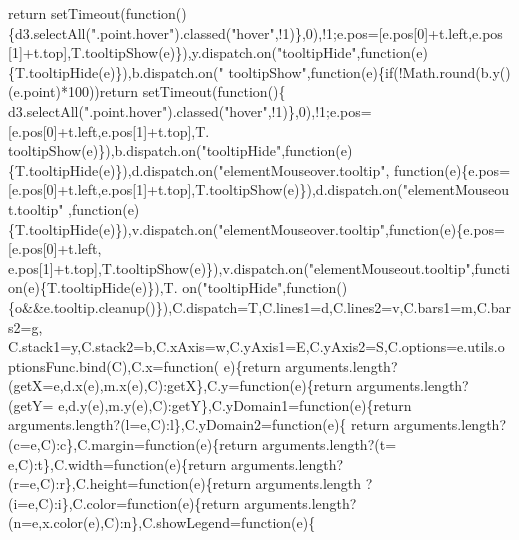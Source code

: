 \begin{DoxyCode}
{      return} setTimeout(\textcolor{keyword}{function}()\{d3.selectAll(\textcolor{stringliteral}{".point.hover"}).classed(\textcolor{stringliteral}{"hover"},!1)\},0),!1;e.pos=[e.pos[0]+t.left,e.pos
      [1]+t.top],T.tooltipShow(e)\}),y.dispatch.on(\textcolor{stringliteral}{"tooltipHide"},\textcolor{keyword}{function}(e)\{T.tooltipHide(e)\}),b.dispatch.on(\textcolor{stringliteral}{"
      tooltipShow"},\textcolor{keyword}{function}(e)\{\textcolor{keywordflow}{if}(!Math.round(b.y()(e.point)*100))\textcolor{keywordflow}{return} setTimeout(\textcolor{keyword}{function}()\{
      d3.selectAll(\textcolor{stringliteral}{".point.hover"}).classed(\textcolor{stringliteral}{"hover"},!1)\},0),!1;e.pos=[e.pos[0]+t.left,e.pos[1]+t.top],T.
      tooltipShow(e)\}),b.dispatch.on(\textcolor{stringliteral}{"tooltipHide"},\textcolor{keyword}{function}(e)\{T.tooltipHide(e)\}),d.dispatch.on(\textcolor{stringliteral}{"elementMouseover.tooltip"},\textcolor{keyword}{
      function}(e)\{e.pos=[e.pos[0]+t.left,e.pos[1]+t.top],T.tooltipShow(e)\}),d.dispatch.on(\textcolor{stringliteral}{"elementMouseout.tooltip"}
      ,\textcolor{keyword}{function}(e)\{T.tooltipHide(e)\}),v.dispatch.on(\textcolor{stringliteral}{"elementMouseover.tooltip"},\textcolor{keyword}{function}(e)\{e.pos=[e.pos[0]+t.left,
      e.pos[1]+t.top],T.tooltipShow(e)\}),v.dispatch.on(\textcolor{stringliteral}{"elementMouseout.tooltip"},\textcolor{keyword}{function}(e)\{T.tooltipHide(e)\}),T.
      on(\textcolor{stringliteral}{"tooltipHide"},\textcolor{keyword}{function}()\{o&&e.tooltip.cleanup()\}),C.dispatch=T,C.lines1=d,C.lines2=v,C.bars1=m,C.bars2=g,
      C.stack1=y,C.stack2=b,C.xAxis=w,C.yAxis1=E,C.yAxis2=S,C.options=e.utils.optionsFunc.bind(C),C.x=\textcolor{keyword}{function}(
      e)\{\textcolor{keywordflow}{return} arguments.length?(getX=e,d.x(e),m.x(e),C):getX\},C.y=\textcolor{keyword}{function}(e)\{\textcolor{keywordflow}{return} arguments.length?(getY=
      e,d.y(e),m.y(e),C):getY\},C.yDomain1=\textcolor{keyword}{function}(e)\{\textcolor{keywordflow}{return} arguments.length?(l=e,C):l\},C.yDomain2=\textcolor{keyword}{function}(e)\{\textcolor{keywordflow}{
      return} arguments.length?(c=e,C):c\},C.margin=\textcolor{keyword}{function}(e)\{\textcolor{keywordflow}{return} arguments.length?(t=
      e,C):t\},C.width=\textcolor{keyword}{function}(e)\{\textcolor{keywordflow}{return} arguments.length?(r=e,C):r\},C.height=\textcolor{keyword}{function}(e)\{\textcolor{keywordflow}{return} arguments.length
      ?(i=e,C):i\},C.color=\textcolor{keyword}{function}(e)\{\textcolor{keywordflow}{return} arguments.length?(n=e,x.color(e),C):n\},C.showLegend=\textcolor{keyword}{function}(e)\{\textcolor{keywordflow}{
}
\end{DoxyCode}
